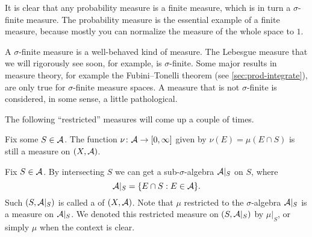 It is clear that any probability measure is a finite measure, which is in turn a $\sigma$-finite measure. The probability measure is the essential example of a finite measure, because mostly you can normalize the measure of the whole space to $1$.

A $\sigma$-finite measure is a well-behaved kind of measure. The Lebesgue measure that we will rigorously see soon, for example, is $\sigma$-finite. Some major results in measure theory, for example the Fubini--Tonelli theorem (see \cref{sec:prod-integrate}), are only true for $\sigma$-finite measure spaces. A measure that is not $\sigma$-finite is considered, in some sense, a little pathological.

The following ``restricted'' measures will come up a couple of times.
\begin{fact} \label{fact:restrict-meausre-original-space}
    Fix some $S \in \mathcal{A}$. The function $\nu\colon \mathcal{A}\to [0,\infty]$ given by $\nu(E) = \mu(E \cap S)$ is still a measure on $(X,\mathcal{A})$.
\end{fact}

\begin{fact} \label{fact:restrict-meausre-restrict-space}
    Fix $S\in \mathcal{A}$. By intersecting $S$ we can get a sub-$\sigma$-algebra $\mathcal{A}|_S$ on $S$, where \[
        \mathcal{A}|_S = \{E \cap S: E\in\mathcal{A}\}.
    \] Such $(S,\mathcal{A}|_S)$ is called a  of $(X,\mathcal{A})$. Note that $\mu$ restricted to the $\sigma$-algebra $\mathcal{A}|_S$ is a measure on $\mathcal{A}|_S$. We denoted this restricted measure on $(S,\mathcal{A}|_S)$ by $\mu|_S$, or simply $\mu$ when the context is clear. 
\end{fact}

